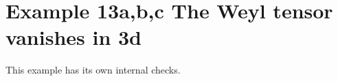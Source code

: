 \documentclass[12pt]{cdblatex}
\begin{document}
\section*{Example 13a,b,c The Weyl tensor vanishes in 3d}

This example has its own internal checks.
\end{document}
